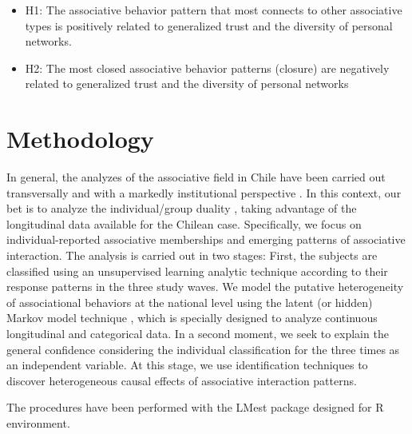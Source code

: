 \begin{itemize}
  \item H1: The associative behavior pattern that most connects to other associative types is positively related to generalized trust and the diversity of personal networks. 
  \item H2: The most closed associative behavior patterns (closure) are negatively related to generalized trust and the diversity of personal networks 
\end{itemize}





\section{Methodology}

In general, the analyzes of the associative field in Chile have been carried out transversally and with a markedly institutional perspective \parencite{irarrazaval_chile_2017,irarrazaval_sociedad_2017, programa_de_las_naciones_unidas_para_el_desarrollo_desarrollo_2000}. In this context, our bet is to analyze the individual/group duality \parencite{breiger_duality_1974, mcpherson_hypernetwork_1982}, taking advantage of the longitudinal data available for the Chilean case. Specifically, we focus on individual-reported associative memberships and emerging patterns of associative interaction. The analysis is carried out in two stages: First, the subjects are classified using an unsupervised learning analytic technique \parencite{molina_machine_2019} according to their response patterns in the three study waves. We model the putative heterogeneity of associational behaviors at the national level using the latent (or hidden) Markov model technique \parencite{bartolucci_latent_2015}, which is specially designed to analyze continuous longitudinal and categorical data. In a second moment, we seek to explain the general confidence considering the individual classification for the three times as an independent variable.  At this stage, we use identification techniques to discover heterogeneous causal effects of associative interaction patterns.
\bigskip



The procedures have been performed with the LMest package \parencite{bartolucci_lmest_2020} designed for R environment. 

